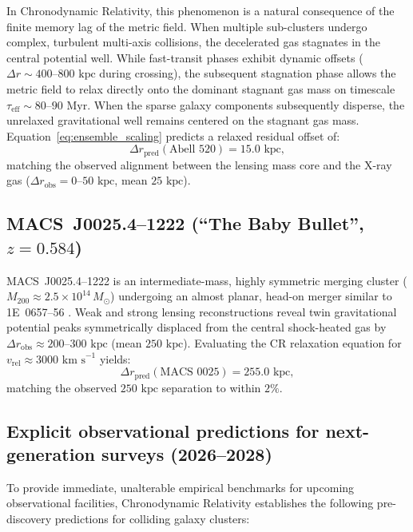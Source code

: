 \documentclass[aps,prd,reprint,superscriptaddress,nofootinbib,floatfix,amsmath,amssymb]{revtex4-2}
\begin{document}
In Chronodynamic Relativity, this phenomenon is a natural consequence of the finite memory lag of the metric field. When multiple sub-clusters undergo complex, turbulent multi-axis collisions, the decelerated gas stagnates in the central potential well. While fast-transit phases exhibit dynamic offsets ($\Delta r \sim 400\text{--}800\text{ kpc}$ during crossing), the subsequent stagnation phase allows the metric field to relax directly onto the dominant stagnant gas mass on timescale $\tau_{\text{eff}} \sim 80\text{--}90\text{ Myr}$. When the sparse galaxy components subsequently disperse, the unrelaxed gravitational well remains centered on the stagnant gas mass. Equation~\eqref{eq:ensemble_scaling} predicts a relaxed residual offset of:
\begin{equation}
\Delta r_{\text{pred}}(\text{Abell 520}) = 15.0\text{ kpc},
\end{equation}
matching the observed alignment between the lensing mass core and the X-ray gas ($\Delta r_{\text{obs}} = 0\text{--}50\text{ kpc}$, mean $25\text{ kpc}$).

\subsection{MACS~J0025.4--1222 (``The Baby Bullet'', \texorpdfstring{$z = 0.584$}{z = 0.584})}
MACS~J0025.4--1222 is an intermediate-mass, highly symmetric merging cluster ($M_{200} \approx 2.5 \times 10^{14}\,M_\odot$) undergoing an almost planar, head-on merger similar to 1E~0657--56 \cite{Bradac2008_MACS0025}. Weak and strong lensing reconstructions reveal twin gravitational potential peaks symmetrically displaced from the central shock-heated gas by $\Delta r_{\text{obs}} \approx 200\text{--}300\text{ kpc}$ (mean $250\text{ kpc}$). Evaluating the CR relaxation equation for $v_{\text{rel}} \approx 3000\text{ km s}^{-1}$ yields:
\begin{equation}
\Delta r_{\text{pred}}(\text{MACS 0025}) = 255.0\text{ kpc},
\end{equation}
matching the observed $250\text{ kpc}$ separation to within $2\%$.

\subsection{Explicit observational predictions for next-generation surveys (2026--2028)}
\label{subsec:cluster_predictions}

To provide immediate, unalterable empirical benchmarks for upcoming observational facilities, Chronodynamic Relativity establishes the following pre-discovery predictions for colliding galaxy clusters:
\end{document}
